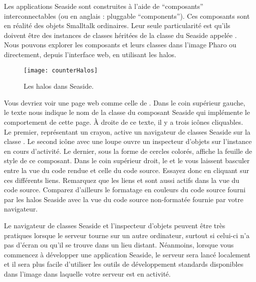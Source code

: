 \documentclass[a4paper,10pt,twoside]{book}
\begin{document}
Les applications Seaside sont construites à l'aide de
``composants'' interconnectables (ou en anglais : pluggable ``components'').
Ces composants sont en réalité des objets Smalltalk ordinaires.
Leur seule particularité est qu'ils doivent être des instances de
classes héritées de la classe du \framework Seaside appelée
.
Nous pouvons explorer les composants et leurs classes dans l'image
Pharo ou directement, depuis l'interface web, en utilisant les halos.


\begin{figure}[ht]
\begin{center}
\texttt{[image: counterHalos]}
\caption{Les halos dans Seaside.}
\end{center}
\end{figure}


Vous devriez voir une page web comme celle de .
Dans le coin supérieur gauche, le texte  nous indique le
nom de la classe du composant Seaside qui implémente le comportement
de cette page. À droite de ce texte, il y a trois icônes
cliquables.
Le premier, représentant un crayon, active un navigateur de classes
Seaside sur la classe . Le second icône avec une loupe
ouvre un inspecteur d'objets sur l'instance  en cours
d'activité.
Le dernier, sous la forme de cercles colorés, affiche la feuille de
style  de ce composant.
Dans le coin supérieur droit, le 
  et le   vous laissent basculer entre la vue du
 code rendue et celle du code source.
Essayez donc en cliquant sur ces différents liens.
Remarquez que les liens \link{++} et \link{{-}{-}} sont aussi actifs dans
la vue du code source.
Comparez d'ailleurs le formatage en couleurs du code source fourni
par les halos Seaside avec la vue du code source non-formatée fournie
par votre navigateur.

Le navigateur de classes Seaside et l'inspecteur d'objets peuvent être
très pratiques lorsque le serveur tourne sur un autre ordinateur,
surtout si celui-ci n'a pas d'écran ou qu'il se trouve dans un lieu
distant.
Néanmoins, lorsque vous commencez à développer une application
Seaside, le serveur sera lancé localement et il sera plus facile
d'utiliser les outils de développement standards disponibles dans
l'image \pharo dans laquelle votre serveur est en activité.
 
\end{document}
